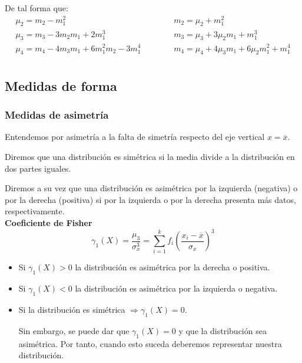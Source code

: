 \noindent De tal forma que:
\begin{equation*}
    \begin{array}{lcl}
        \mu_2 = m_2 - m_1^2 & \hspace{1cm} & m_2 = \mu_2 + m_1^2\\
        \mu_3 = m_3 - 3m_2m_1 + 2m_1^3 & \hspace{1cm} & m_3 = \mu_3 + 3\mu_2 m_1 + m_1^3\\
        \mu_4 = m_4 - 4m_3m_1 + 6m_1^2m_2 - 3 m_1^4 & \hspace{1cm} & m_4 = \mu_4 + 4\mu_3 m_1 + 6\mu_2 m_1^2 + m_1^4\\
    \end{array}
\end{equation*}

\subsection{Medidas de forma}
\subsubsection{Medidas de asimetría}

Entendemos por asimetría a la falta de simetría respecto del eje vertical $x=\overline{x}$.

Diremos que una distribución es simétrica si la media divide a la distribución en dos partes iguales.

Diremos a su vez que una distribución es asimétrica por la izquierda (negativa) o por la derecha (positiva) si
por la izquierda o por la derecha presenta más datos, respectivamente.\\

\textbf{Coeficiente de Fisher}
$$\gamma_1(X) = \dfrac{\mu_3}{\sigma_x^3} = \sum_{i=1}^k f_i \left( \dfrac{x_i - \overline{x}}{\sigma_x} \right)^3$$

\begin{itemize}
    \item Si $\gamma_1(X) > 0$ la distribución es asimétrica por la derecha o positiva.
    \item Si $\gamma_1(X) < 0$ la distribución es asimétrica por la izquierda o negativa.
    \item Si la distribución es simétrica $\Rightarrow \gamma_1(X)=0$.

    Sin embargo, se puede dar que $\gamma_1(X)=0$ y que la distribución sea asimétrica. Por tanto, cuando esto suceda deberemos representar nuestra distribución.
\end{itemize}

